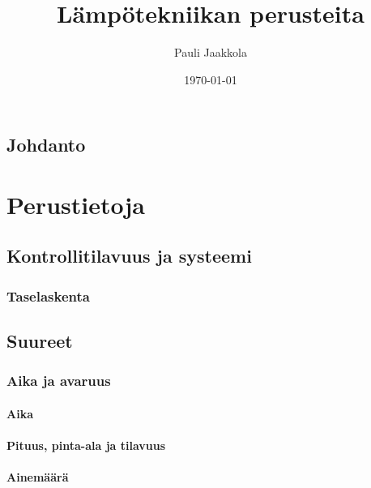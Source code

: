 \documentclass[12pt,a4paper,finnish]{book}
\title{Lämpötekniikan perusteita}
\date{\today}
\author{Pauli Jaakkola}
\begin{document}
\maketitle
\newpage
{}
\tableofcontents
\newpage
{}

\chapter{Johdanto}

\part{Perustietoja} %

\chapter{Kontrollitilavuus ja systeemi} %

\section{Taselaskenta}

\chapter{Suureet} %

\section{Aika ja avaruus}

\subsection{Aika}

\subsection{Pituus, pinta-ala ja tilavuus}

\subsection{Ainemäärä}
\end{document}
